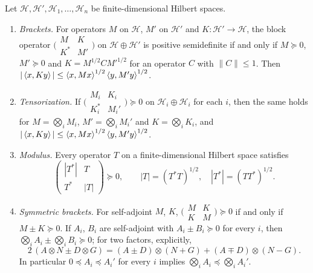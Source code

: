 \begin{lemma}\label{lem:record:block-gram}
Let $\mathcal H,\mathcal H',\mathcal H_1,\dots,\mathcal H_n$ be finite-dimensional
Hilbert spaces.
\begin{enumerate}[label=(\alph*)]
\item \emph{Brackets.} For operators $M$ on $\mathcal H$, $M'$ on $\mathcal H'$
 and $K\colon\mathcal H'\to\mathcal H$, the block operator
 $\bigl(\begin{smallmatrix}M&K\\ K^*&M'\end{smallmatrix}\bigr)$ on
 $\mathcal H\oplus\mathcal H'$ is positive semidefinite if and only if
 $M\succeq0$, $M'\succeq0$ and $K=M^{1/2}CM'^{1/2}$ for an operator $C$ with
 $\|C\|\le1$. Then $|\left\langle x,Ky\right\rangle|\le\left\langle x,Mx\right\rangle^{1/2}\left\langle y,M'y\right\rangle^{1/2}$.
\item \emph{Tensorization.} If
 $\bigl(\begin{smallmatrix}M_i&K_i\\ K_i^*&M_i'\end{smallmatrix}\bigr)\succeq0$
 on $\mathcal H_i\oplus\mathcal H_i$ for each $i$, then the same holds for
 $M=\bigotimes_iM_i$, $M'=\bigotimes_iM_i'$ and $K=\bigotimes_iK_i$, and
 $|\left\langle x,Ky\right\rangle|\le\left\langle x,Mx\right\rangle^{1/2}\left\langle y,M'y\right\rangle^{1/2}$.
\item \emph{Modulus.} Every operator $T$ on a finite-dimensional Hilbert space
 satisfies
 \[
  \begin{pmatrix}|T^*|&T\\ T^*&|T|\end{pmatrix}\succeq0,
  \qquad |T|=(T^*T)^{1/2},\quad |T^*|=(TT^*)^{1/2}.
 \]
\item \emph{Symmetric brackets.} For self-adjoint $M$, $K$,
 $\bigl(\begin{smallmatrix}M&K\\ K&M\end{smallmatrix}\bigr)\succeq0$ if and only
 if $M\pm K\succeq0$. If $A_i$, $B_i$ are self-adjoint with $A_i\pm B_i\succeq0$
 for every $i$, then $\bigotimes_iA_i\pm\bigotimes_iB_i\succeq0$; for two
 factors, explicitly,
 \[
  2\,(A\otimes N\pm D\otimes G)=(A\pm D)\otimes(N+G)+(A\mp D)\otimes(N-G).
 \]
 In particular $0\preceq A_i\preceq A_i'$ for every $i$ implies
 $\bigotimes_iA_i\preceq\bigotimes_iA_i'$.
\end{enumerate}
\end{lemma}

